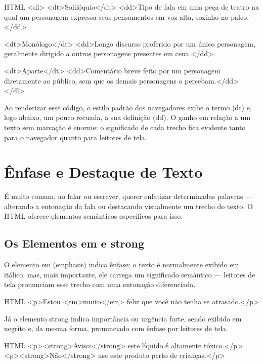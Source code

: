 \begin{codebox}{HTML}
<dl>
  <dt>Solilóquio</dt>
  <dd>Tipo de fala em uma peça de teatro na qual um personagem
      expressa seus pensamentos em voz alta, sozinho no palco.</dd>

    <dt>Monólogo</dt>
    <dd>Longo discurso proferido por um único personagem,
        geralmente dirigido a outros personagens presentes em cena.</dd>

  <dt>Aparte</dt>
  <dd>Comentário breve feito por um personagem diretamente
      ao público, sem que os demais personagens o percebam.</dd>
</dl>
\end{codebox}

Ao renderizar esse código, o estilo padrão dos navegadores exibe o termo (dt) e, logo abaixo, um pouco recuada, a sua definição (dd). O ganho em relação a um texto sem marcação é enorme: o significado de cada trecho fica evidente tanto para o navegador quanto para leitores de tela.

\section{Ênfase e Destaque de Texto}

É muito comum, ao falar ou escrever, querer enfatizar determinadas palavras — alterando a entonação da fala ou destacando visualmente um trecho do texto. O HTML oferece elementos semânticos específicos para isso.

\subsection{Os Elementos em e strong}

O elemento em (emphasis) indica ênfase: o texto é normalmente exibido em itálico, mas, mais importante, ele carrega um significado semântico — leitores de tela pronunciam esse trecho com uma entonação diferenciada.

\begin{codebox}{HTML}
<p>Estou <em>muito</em> feliz que você não tenha se atrasado.</p>
\end{codebox}

Já o elemento strong indica importância ou urgência forte, sendo exibido em negrito e, da mesma forma, pronunciado com ênfase por leitores de tela.

\begin{codebox}{HTML}
<p><strong>Aviso:</strong> este líquido é altamente tóxico.</p>
<p><strong>Não</strong> use este produto perto de crianças.</p>
\end{codebox}

